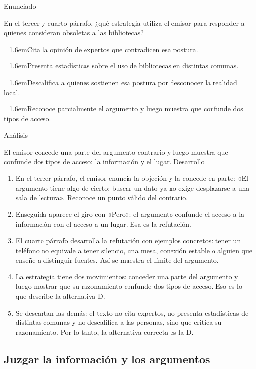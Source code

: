 \documentclass[10pt,a4paper,twocolumn]{article}
\newcommand{\alternativa}[2]{\par\noindent\hangindent=1.6em\hangafter=1\makebox[1.6em][l]{\tecla{#1}}#2\par}
\newcommand{\clave}[1]{\par\smallskip{\sffamily\footnotesize\color{esmeralda} Clave \teclaok{#1}}\par}
\begin{document}
\begin{ejemplo}
{\sffamily\footnotesize\color{zinc500} Enunciado}\par
En el tercer y cuarto párrafo, ¿qué estrategia utiliza el emisor para responder a quienes consideran obsoletas a las bibliotecas?
\alternativa{A}{Cita la opinión de expertos que contradicen esa postura.}
\alternativa{B}{Presenta estadísticas sobre el uso de bibliotecas en distintas comunas.}
\alternativa{C}{Descalifica a quienes sostienen esa postura por desconocer la realidad local.}
\alternativa{D}{Reconoce parcialmente el argumento y luego muestra que confunde dos tipos de acceso.}
\clave{D}
{\sffamily\footnotesize\color{zinc500} Análisis}\par El emisor concede una parte del argumento contrario y luego muestra que confunde dos tipos de acceso: la información y el lugar.
{\sffamily\footnotesize\color{zinc500} Desarrollo}
\begin{enumerate}
  \item En el tercer párrafo, el emisor enuncia la objeción y la concede en parte: «El argumento tiene algo de cierto: buscar un dato ya no exige desplazarse a una sala de lectura». Reconoce un punto válido del contrario.
  \item Enseguida aparece el giro con «Pero»: el argumento confunde el acceso a la información con el acceso a un lugar. Esa es la refutación.
  \item El cuarto párrafo desarrolla la refutación con ejemplos concretos: tener un teléfono no equivale a tener silencio, una mesa, conexión estable o alguien que enseñe a distinguir fuentes. Así se muestra el límite del argumento.
  \item La estrategia tiene dos movimientos: conceder una parte del argumento y luego mostrar que su razonamiento confunde dos tipos de acceso. Eso es lo que describe la alternativa D.
  \item Se descartan las demás: el texto no cita expertos, no presenta estadísticas de distintas comunas y no descalifica a las personas, sino que critica su razonamiento. Por lo tanto, la alternativa correcta es la D.
\end{enumerate}
\end{ejemplo}

\subsection{Juzgar la información y los argumentos}
\end{document}
